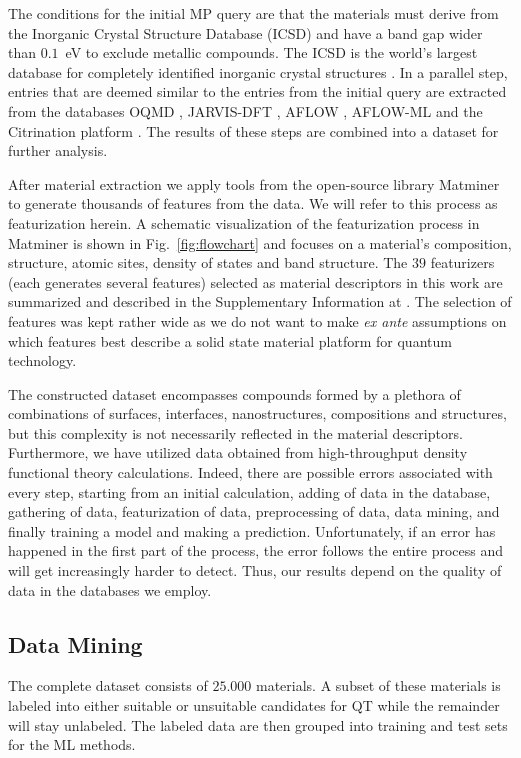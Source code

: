 \documentclass[superscriptaddress,unsortedaddress,
 amsmath,amssymb,
 aps,
]{revtex4-2}
\begin{document}
The conditions for the initial MP query are that the materials must derive from the Inorganic Crystal Structure Database (ICSD) and have a band gap wider than $0.1$~eV to exclude metallic compounds. The ICSD is the world's largest database for completely identified inorganic crystal structures \cite{Allen1987,Zagorac2019}. In a parallel step, entries that are deemed similar to the entries from the initial query are extracted from the databases OQMD  \cite{Saal2013,Kirklin2015}, JARVIS-DFT \cite{Choudhary2020}, AFLOW \cite{Curtarolo2012, Curtarolo2012a, Calderon2015}, AFLOW-ML \cite{Isayev2017} and the Citrination platform \cite{OMaraJordan2016MDIA}. The results of these steps are combined into a dataset for further analysis. 

After material extraction we apply tools from the open-source library Matminer \cite{Ward2018} to generate thousands of features from the data. We will refer to this process as featurization herein. A schematic visualization of the featurization process in Matminer is shown in  Fig.~\ref{fig:flowchart} 
and focuses on a material's composition,  structure, atomic sites, density of states and band structure. 
The $39$ featurizers (each generates several features) selected as material descriptors in this work are summarized and described in the Supplementary Information at \cite{supplementary}. The selection of features was kept rather wide as we do not want to make {\em ex ante} assumptions on which features best describe a solid state material platform for quantum technology. 

The constructed dataset encompasses compounds formed by a plethora of combinations of surfaces, interfaces, nanostructures, compositions and structures, but this complexity is not necessarily reflected in the material descriptors. 
Furthermore, we have utilized data obtained from high-throughput density functional theory calculations. Indeed, there are possible errors associated with every step, starting from an initial calculation, adding of data in the database, gathering of data, featurization of data, preprocessing of data, data mining, and finally training a model and making a prediction. Unfortunately, if an error has happened in the first part of the process, the error follows the entire process and will get increasingly harder to detect. Thus, our results depend on the quality of data in the databases we employ. 

\subsection*{Data Mining}
The complete dataset consists of $25.000$ materials. A subset of these materials is labeled into either suitable or unsuitable candidates for QT while the remainder will stay unlabeled. The labeled data are then grouped into training and test sets for the ML methods. 
\end{document}
